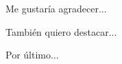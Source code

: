 
\cleardoublepage

\vspace{15ex}


Me gustaría agradecer...
\medskip

También quiero destacar...
\medskip

Por último...
